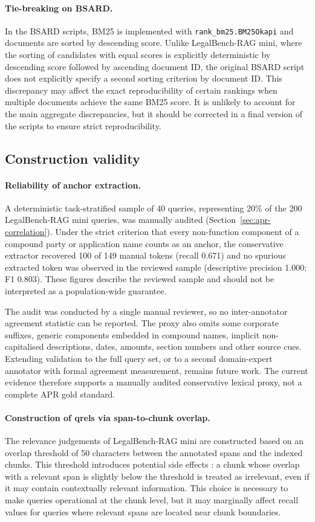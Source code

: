 \documentclass[a4paper,fleqn]{cas-dc}
\begin{document}
\paragraph{Tie-breaking on BSARD.}
In the BSARD scripts, BM25 is implemented with
\texttt{rank\_bm25.BM25Okapi} and documents are
sorted by descending score. Unlike 
LegalBench-RAG mini, where the sorting of candidates with
equal scores is explicitly deterministic by
descending score followed by ascending document ID, the
original BSARD script does not explicitly specify a
second sorting criterion by document ID. This
discrepancy may affect the exact reproducibility of
certain rankings when multiple documents achieve
the same BM25 score. It is unlikely to account for
the main aggregate discrepancies, but it should be
corrected in a final version of the scripts to
ensure strict reproducibility.
\subsection{Construction validity}
\paragraph{Reliability of anchor extraction.}
A deterministic task-stratified sample of 40 queries, representing
20\% of the 200 LegalBench-RAG mini queries, was manually audited
(Section~\ref{sec:apr-correlation}). Under the strict criterion that
every non-function component of a compound party or application name
counts as an anchor, the conservative extractor recovered 100 of 149
manual tokens (recall 0.671) and no spurious extracted token was observed
in the reviewed sample (descriptive precision 1.000; F1 0.803). These
figures describe the reviewed sample and should not be interpreted as a
population-wide guarantee.

The audit was conducted by a single manual reviewer, so no
inter-annotator agreement statistic can be reported. The proxy also omits
some corporate suffixes, generic components embedded in compound names,
implicit non-capitalised descriptions, dates, amounts, section numbers
and other source cues. Extending validation to the full query set, or to
a second domain-expert annotator with formal agreement measurement,
remains future work. The current evidence therefore supports a manually
audited conservative lexical proxy, not a complete APR gold standard.
\paragraph{Construction of qrels via
span-to-chunk overlap.}
The relevance judgements of LegalBench-RAG mini are
constructed based on an overlap threshold of
50 characters between the annotated spans and the
indexed chunks. This threshold introduces potential side effects
: a chunk whose overlap with a
relevant span is slightly below the threshold is treated
as irrelevant, even if it may contain
contextually relevant information. This choice is
necessary to make queries operational at the
chunk level, but it may marginally affect
recall values for queries where relevant spans
are located near chunk boundaries.
\end{document}
